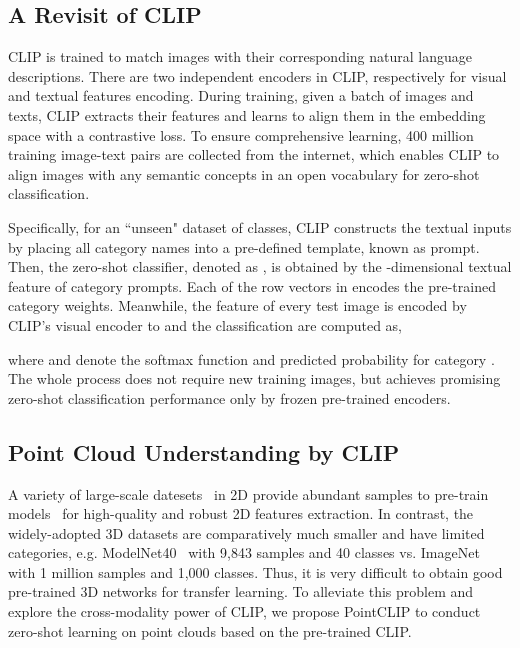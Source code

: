 \documentclass[10pt,twocolumn,letterpaper]{article}
\begin{document}
\vspace*{1pt}
\subsection{A Revisit of CLIP}
\label{reclip}
CLIP is trained to match images with their corresponding natural language descriptions. There are two independent encoders in CLIP, respectively for visual and textual features encoding. During training, given a batch of images and texts, CLIP extracts their features and learns to align them in the embedding space with a contrastive loss. To ensure comprehensive learning, 400 million training image-text pairs are collected from the internet, which enables CLIP to align images with any semantic concepts in an open vocabulary for zero-shot classification.

Specifically, for an ``unseen" dataset of  classes, CLIP constructs the textual inputs by placing all category names into a pre-defined template, known as prompt. Then, the zero-shot classifier, denoted as , is obtained by the -dimensional textual feature of category prompts. Each of the  row vectors in  encodes the pre-trained category weights. Meanwhile, the feature of every test image is encoded by CLIP's visual encoder to  and the classification  are computed as,

where  and  denote the softmax function and predicted probability for category . The whole process does not require new training images, but achieves promising zero-shot classification performance only by frozen pre-trained encoders.

\vspace*{1pt}
\subsection{Point Cloud Understanding by CLIP}
\label{pointclip}

A variety of large-scale datesets~\cite{krizhevsky2012imagenet, lin2014microsoft} in 2D provide abundant samples to pre-train models~\cite{he2016deep, dosovitskiy2020image} for high-quality and robust 2D features extraction. In contrast, the widely-adopted 3D datasets are comparatively much smaller and have limited categories, e.g. ModelNet40~\cite{wu20153d} with 9,843 samples and 40 classes vs. ImageNet~\cite{krizhevsky2012imagenet} with 1 million samples and 1,000 classes.
Thus, it is very difficult to obtain good pre-trained 3D networks for transfer learning. To alleviate this problem and explore the cross-modality power of CLIP, we propose PointCLIP to conduct zero-shot learning on point clouds based on the pre-trained CLIP.
\end{document}
